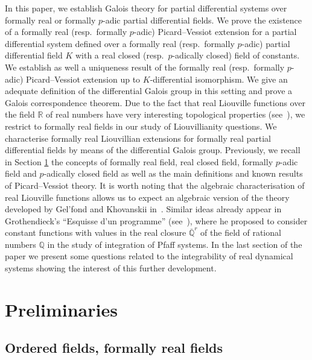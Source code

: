 \documentclass[pdftex]{sigma}%
\numberwithin{equation}{section}
\newcommand{\R}{\mathbb{R}}
\newcommand{\Q}{\mathbb{Q}}
\begin{document}
In this paper, we establish Galois theory for partial differential systems over formally real or formally $p$-adic partial differential fields. We prove the existence of a formally real (resp.\ formally $p$-adic) Picard--Vessiot extension for a partial differential system defined over a formally real (resp.\ formally $p$-adic) partial differential field $K$ with a real closed (resp.\ $p$-adically closed) field of constants. We establish as well a uniqueness result of the formally real (resp.\ formally $p$-adic) Picard--Vessiot extension up to $K$-differential isomorphism. We give an adequate definition of the differential Galois group in this setting and prove a Galois correspondence theorem. Due to the fact that real Liouville functions over the field $\R$ of real numbers have very interesting topological properties (see~\cite{GK,Kh}), we restrict to formally real fields in our study of Liouvillianity questions. We characterise formally real Liouvillian extensions for formally real partial differential fields by means of the differential Galois group. Previously, we recall in Section \ref{prelim} the concepts of formally real field, real closed field, formally $p$-adic field and $p$-adically closed field as well as the main definitions and known results of Picard--Vessiot theory. It is worth noting that the algebraic characterisation of real Liouville functions allows us to expect an algebraic version of the theory developed by Gel'fond and Khovanskii in~\cite{GK,Kh}. Similar ideas already appear in Grothendieck's ``Esquisse d'un programme'' (see~\cite[p.~272]{GGA}), where he proposed to consider constant functions with values in the real closure $\overline{\Q}^r$ of the field of rational numbers $\Q$ in the study of integration of Pfaff systems. In the last section of the paper we present some questions related to the integrability of real dynamical systems showing the interest of this further development.



\section{Preliminaries}\label{prelim}

\subsection{Ordered fields, formally real fields}
\end{document}
